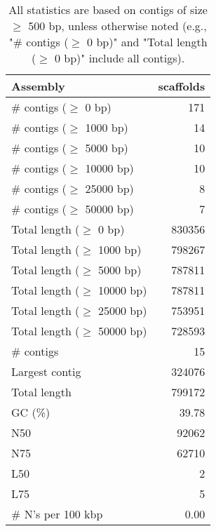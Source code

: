 \documentclass[12pt,a4paper]{article}
\begin{document}
\begin{table}[ht]
\begin{center}
\caption{All statistics are based on contigs of size $\geq$ 500 bp, unless otherwise noted (e.g., "\# contigs ($\geq$ 0 bp)" and "Total length ($\geq$ 0 bp)" include all contigs).}
\begin{tabular}{|l*{1}{|r}|}
\hline
Assembly & scaffolds \\ \hline
\# contigs ($\geq$ 0 bp) & 171 \\ \hline
\# contigs ($\geq$ 1000 bp) & 14 \\ \hline
\# contigs ($\geq$ 5000 bp) & 10 \\ \hline
\# contigs ($\geq$ 10000 bp) & 10 \\ \hline
\# contigs ($\geq$ 25000 bp) & 8 \\ \hline
\# contigs ($\geq$ 50000 bp) & 7 \\ \hline
Total length ($\geq$ 0 bp) & 830356 \\ \hline
Total length ($\geq$ 1000 bp) & 798267 \\ \hline
Total length ($\geq$ 5000 bp) & 787811 \\ \hline
Total length ($\geq$ 10000 bp) & 787811 \\ \hline
Total length ($\geq$ 25000 bp) & 753951 \\ \hline
Total length ($\geq$ 50000 bp) & 728593 \\ \hline
\# contigs & 15 \\ \hline
Largest contig & 324076 \\ \hline
Total length & 799172 \\ \hline
GC (\%) & 39.78 \\ \hline
N50 & 92062 \\ \hline
N75 & 62710 \\ \hline
L50 & 2 \\ \hline
L75 & 5 \\ \hline
\# N's per 100 kbp & 0.00 \\ \hline
\end{tabular}
\end{center}
\end{table}
\end{document}
